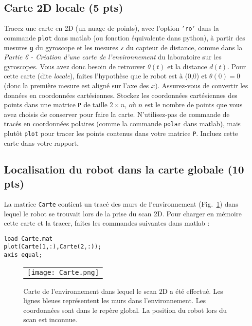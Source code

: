 \documentclass[12pt]{article}
\begin{document}
\subsection{Carte 2D locale (5 pts)}
\label{CarteLocale}

Tracez une carte en 2D (un nuage de points), avec l'option \texttt{'ro'} dans la commande \texttt{plot} dans matlab (ou fonction équivalente dans python), à partir des mesures \texttt{g} du gyroscope et les mesures \texttt{z} du capteur de distance, comme dans la \emph{Partie 6 - Création d'une carte de l'environnement} du laboratoire sur les gyroscopes. Vous avez donc besoin de retrouver $\theta(t)$ et la distance $d(t)$. Pour cette carte (dite \emph{locale}), faites l'hypothèse que le robot est à (0,0) et $\theta(0)=0$ (donc la première mesure est aligné sur l'axe des $x$). Assurez-vous de convertir les données en coordonnées cartésiennes. Stockez les coordonnées cartésiennes des points dans une matrice \texttt{P} de taille $2\times n$, où $n$ est le nombre de points que vous avez choisis de conserver pour faire la carte. N'utilisez-pas de commande de tracés en coordonnées polaires (comme la commande \texttt{polar} dans matlab), mais plutôt \texttt{plot} pour tracer les points contenus dans votre matrice \texttt{P}. Incluez cette carte dans votre rapport.

\newpage
\subsection{Localisation du robot dans la carte globale (10 pts)}
La matrice \texttt{Carte} contient un tracé des murs de l'environnement (Fig.~\ref{Environment}) dans lequel le robot se trouvait lors de la prise du scan 2D. Pour charger en mémoire cette carte et la tracer, faites les commandes suivantes dans matlab :

\vspace{-0.1in}
\begin{verbatim}
load Carte.mat
plot(Carte(1,:),Carte(2,:)); 
axis equal;
\end{verbatim}
\vspace{-0.2in}

\begin{figure}[ht]
 \begin{center}
  \begin{tabular}{c}
    \texttt{[image: Carte.png]} 
  \end{tabular}
 \end{center}
\vspace{-0.3in}
 \caption{Carte de l'environnement dans lequel le scan 2D a été effectué. Les lignes bleues représentent les murs dans l'environnement. Les coordonnées sont dans le repère global. La position du robot lors du scan est inconnue.}
 \label{Environment}
\end{figure}
\end{document}

